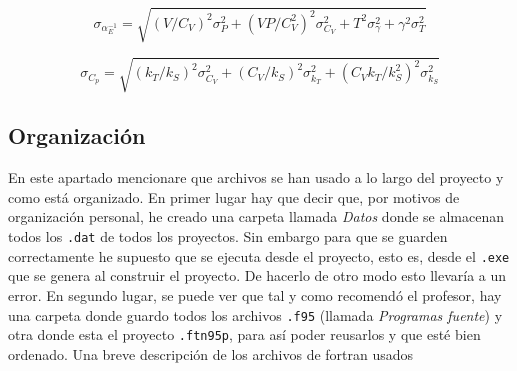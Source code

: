 \documentclass[11pt]{article} %
\begin{document}
\begin{equation}
	\sigma_{\alpha_E^{-1}} =\sqrt{(V/C_V)^2\sigma_P^2+(VP/C_V^2)^2 \sigma_{C_V}^2 +T^2  \sigma_{\gamma}^2 + \gamma^2 \sigma_T^2}
\end{equation}


\begin{equation}
	\sigma_{C_p} =\sqrt{(k_T/k_S)^2 \sigma_{C_V}^2 + (C_V/k_S)^2 \sigma_{k_T}^2 + (C_Vk_T /k_S^2)^2 \sigma_{k_S}^2}
\end{equation}



\subsection{Organización} \label{Subsec:02}

En este apartado mencionare que archivos se han usado a lo largo del proyecto y como está organizado. En primer lugar hay que decir que, por motivos de organización personal, he creado una carpeta llamada \textit{Datos} donde se almacenan todos los \texttt{.dat} de todos los proyectos. Sin embargo para que se guarden correctamente he supuesto que se ejecuta desde el proyecto, esto es, desde el \texttt{.exe} que se genera al construir el proyecto. De hacerlo de otro modo esto llevaría a un error. En segundo lugar, se puede ver que tal y como recomendó el profesor, hay una carpeta donde guardo todos los archivos \texttt{.f95} (llamada \textit{Programas fuente}) y otra donde esta el proyecto \texttt{.ftn95p}, para así poder reusarlos y que esté bien ordenado. Una breve descripción de los archivos de fortran usados
\end{document}
